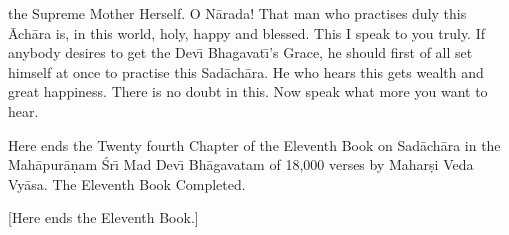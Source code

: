 the Supreme Mother Herself. O N\=arada! That man who practises duly this \=Ach\=ara is, in this world, holy, happy and blessed. This I speak to you truly. If anybody desires to get the Dev\={\i} Bhagavat\={\i}'s Grace, he should first of all set himself at once to practise this Sad\=ach\=ara. He who hears this gets wealth and great happiness. There is no doubt in this. Now speak what more you want to hear.

Here ends the Twenty fourth Chapter of the Eleventh Book on Sad\=ach\=ara in the Mah\=apur\=a\d{n}am \'Sr\={\i} Mad Dev\={\i} Bh\=agavatam of 18,000 verses by Mahar\d{s}i Veda Vy\=asa. The Eleventh Book Completed.

[Here ends the Eleventh Book.]



